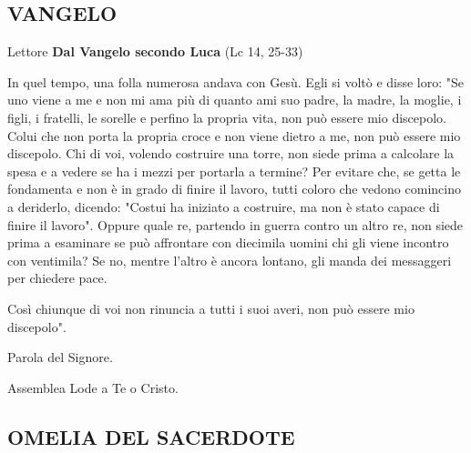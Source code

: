 \subsection*{VANGELO}

\begin{dialoghi}
\item[Lettore] \textbf{Dal Vangelo secondo Luca} (Lc 14, 25-33)

In quel tempo, una folla numerosa andava con Gesù. Egli si voltò e disse loro: "Se uno viene a me e non mi ama più di quanto ami suo padre, la madre, la moglie, i figli, i fratelli, le sorelle e perfino la propria vita, non può essere mio discepolo. Colui che non porta la propria croce e non viene dietro a me, non può essere mio discepolo. Chi di voi, volendo costruire una torre, non siede prima a calcolare la spesa e a vedere se ha i mezzi per portarla a termine? Per evitare che, se getta le fondamenta e non è in grado di finire il lavoro, tutti coloro che vedono comincino a deriderlo, dicendo: "Costui ha iniziato a costruire, ma non è stato capace di finire il lavoro". Oppure quale re, partendo in guerra contro un altro re, non siede prima a esaminare se può affrontare con diecimila uomini chi gli viene incontro con ventimila? Se no, mentre l'altro è ancora lontano, gli manda dei messaggeri per chiedere pace.

Così chiunque di voi non rinuncia a tutti i suoi averi, non può essere mio discepolo".

Parola del Signore.
\item[Assemblea] Lode a Te o Cristo.
\end{dialoghi}

\subsection*{OMELIA DEL SACERDOTE}
